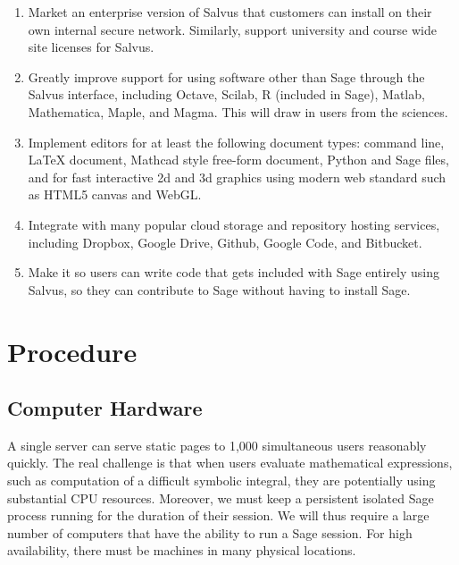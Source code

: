 \documentclass[11pt]{article}
\begin{document}
\begin{enumerate}
\item Market an enterprise version of Salvus that customers can
  install on their own internal secure network.
  Similarly, support university and course wide site licenses for
  Salvus.
\item Greatly improve support for using software other than Sage
  through the Salvus interface, including Octave, Scilab, R (included
  in Sage), Matlab, Mathematica, Maple, and Magma. This will draw in
  users from the sciences.
\item Implement editors for at least the following document types:
  command line, \LaTeX{} document, Mathcad style free-form document,
  Python and Sage files, and for fast interactive 2d and 3d graphics
  using modern web standard such as HTML5 canvas and WebGL.
\item Integrate with many popular cloud storage and repository hosting
  services, including Dropbox, Google Drive, Github, Google Code, and
  Bitbucket.
\item Make it so users can write code that
  gets included with Sage entirely using Salvus, so they can
  contribute to Sage without having to install Sage.
\end{enumerate}


\section{Procedure}


\subsection{Computer Hardware}
A single server can serve static pages to 1,000 simultaneous users
reasonably quickly.  The real challenge is that when users evaluate
mathematical expressions, such as computation of a difficult symbolic
integral, they are potentially using substantial CPU
resources. Moreover, we must keep a persistent isolated Sage process
running for the duration of their session.  We will thus require a
large number of computers that have the ability to run a Sage session.
For high availability, there must be machines in many physical
locations.
\end{document}
